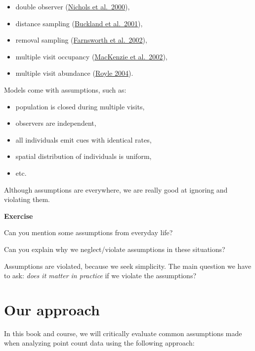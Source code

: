 \documentclass[12pt,]{book}
\providecommand{\tightlist}{%
  \setlength{\itemsep}{0pt}\setlength{\parskip}{0pt}}
\let\BeginKnitrBlock\begin \let\EndKnitrBlock\end
\begin{document}
\begin{itemize}
\tightlist
\item
  double observer (\href{https://doi.org/10.1642/0004-8038(2000)117\%5B0393:ADOAFE\%5D2.0.CO;2}{Nichols et al.~2000}),
\item
  distance sampling (\href{https://global.oup.com/academic/product/introduction-to-distance-sampling-9780198509271}{Buckland et al.~2001}),
\item
  removal sampling (\href{https://doi.org/10.1642/0004-8038(2002)119\%5B0414:ARMFED\%5D2.0.CO;2}{Farnsworth et al.~2002}),
\item
  multiple visit occupancy (\href{https://doi.org/10.1890/0012-9658(2002)083\%5B2248:ESORWD\%5D2.0.CO;2}{MacKenzie et al.~2002}),
\item
  multiple visit abundance (\href{https://doi.org/10.1111/j.0006-341X.2004.00142.x}{Royle 2004}).
\end{itemize}

Models come with assumptions, such as:

\begin{itemize}
\tightlist
\item
  population is closed during multiple visits,
\item
  observers are independent,
\item
  all individuals emit cues with identical rates,
\item
  spatial distribution of individuals is uniform,
\item
  etc.
\end{itemize}

Although assumptions are everywhere, we are really good at ignoring
and violating them.

\BeginKnitrBlock{rmdexercise}
\textbf{Exercise}

Can you mention some assumptions from everyday life?

Can you explain why we neglect/violate assumptions in these situations?
\EndKnitrBlock{rmdexercise}

Assumptions are violated, because we seek simplicity.
The main question we have to ask: \emph{does it matter in practice} if
we violate the assumptions?

\hypertarget{our-approach}{%
\section{Our approach}\label{our-approach}}

In this book and course, we will critically evaluate common assumptions made
when analyzing point count data using the following approach:
\end{document}
